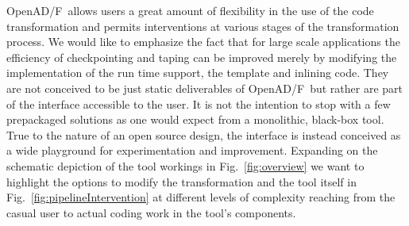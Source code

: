 \documentclass{book}
\newcommand{\OpenADF}{OpenAD/F}
\newcommand{\reffig}[1]{{Fig.~\ref{#1}}}
\begin{document}
\OpenADF\ allows users a great amount of flexibility in the use of the code transformation
and permits interventions at various stages of the transformation process.
We would like to emphasize the fact that for large scale applications 
the efficiency of checkpointing and taping can be improved merely by 
modifying the implementation of the run time support, the template and inlining 
code. 
They are not conceived  to be just static 
deliverables of \OpenADF\ but rather are part of the 
interface accessible to the user.
It is not the intention to stop with a few prepackaged solutions as one 
would expect from a 
monolithic, black-box tool.  
True to the nature of an open source design, the interface is instead conceived as a 
wide playground for 
experimentation and improvement. 
Expanding on the schematic depiction 
of the tool workings in \reffig{fig:overview} we want to highlight 
the options to modify the transformation and the tool itself in \reffig{fig:pipelineIntervention} 
at different levels of complexity reaching from the casual user to 
actual coding work in the tool's components.    
\end{document}
